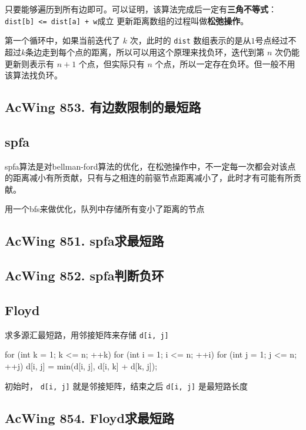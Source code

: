 只要能够遍历到所有边即可。可以证明，该算法完成后一定有\textbf{三角不等式}：\lstinline{dist[b] <= dist[a] + w}成立
更新距离数组的过程叫做\textbf{松弛操作}。

第一个循环中，如果当前迭代了 $k$ 次，此时的 \lstinline{dist} 数组表示的是从$1$号点经过不超过$k$条边走到每个点的距离，所以可以用这个原理来找负环，迭代到第 $n$ 次仍能更新则表示有 $n+1$ 个点，但实际只有 $n$ 个点，所以一定存在负环。但一般不用该算法找负环。

\subsection{AcWing 853. 有边数限制的最短路}

\subsection{spfa}
spfa算法是对bellman-ford算法的优化，在松弛操作中，不一定每一次都会对该点的距离减小有所贡献，只有与之相连的前驱节点距离减小了，此时才有可能有所贡献。

用一个bfs来做优化，队列中存储所有变小了距离的节点

\subsection{AcWing 851. spfa求最短路}

\subsection{AcWing 852. spfa判断负环}

\subsection{Floyd}
求多源汇最短路，用邻接矩阵来存储 \lstinline{d[i, j]}

\begin{mycpponecol}[Floyd算法]
    for (int k = 1; k <= n; ++k) {
        for (int i = 1; i <= n; ++i) {
            for (int j = 1; j <= n; ++j) {
                d[i, j] = min(d[i, j], d[i, k] + d[k, j]);
            }
        }
    }
\end{mycpponecol}

初始时， \lstinline{d[i, j]} 就是邻接矩阵，结束之后 \lstinline{d[i, j]} 是最短路长度

\subsection{AcWing 854. Floyd求最短路}


